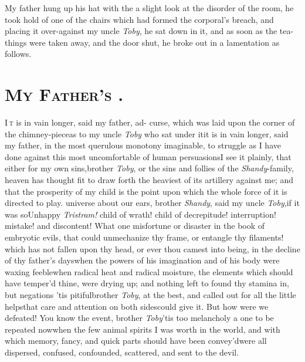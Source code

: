 \documentclass{article}
\begin{document}
My father hung up his hat with the  a slight look at the disorder of the room, he took
hold of one of the chairs which had formed the corporal’s
breach, and placing it over-against my uncle \textit{Toby}, he sat
down in it, and as soon as the tea-things were taken away, and the
door shut, he broke out in a lamentation as follows.

\section{\textsc{My Father's }.}

\lettrine{I}{\,t} is in vain longer, said my father,
ad-\break\hbox{}
curse, which was laid upon the corner of the chimney-piece\tsk as
to my uncle \textit{Toby} who sat under it\tsk it is in vain
longer,\pb
said my father, in the most querulous monotony imaginable,
to struggle as I have done against this most uncomfortable
of human persuasions\tsk I see it plainly, that either for
my own sins,\break brother \textit{Toby}, or the sins and follies
of the \textit{Shandy}-family, heaven has thought fit to
draw forth the heaviest of its artillery against me; and
that the prosperity of my child is the point upon which the
whole force of it is directed to play.\tsh\break
{} universe about our ears,
brother \textit{Shandy}, said my uncle \textit{Toby},\tsk if
it was so\tsk Unhappy \textit{Tristram!} child of wrath!
child of decrepitude!  interruption! mistake! and
discontent! What one misfortune or disaster in the book of
embryotic evils, that could unmechanize thy frame, or
entangle thy filaments!  which has not fallen upon thy head,
or ever thou camest\pb
{} 
into being, in the decline of thy father’s days\tsk when the
powers of his imagination and of his body were waxing
feeble\tsk when radical heat and radical moisture, the
elements which should have temper’d thine, were drying up;
and nothing left to found thy stamina in, but
negations\tsk\break
\tsk ’tis pitiful\tsk brother \textit{Toby}, at the best, and
called out for all the little helps\break that care and attention
on both sides\break could give it. But how were we defeated! You
know the event, brother \textit{Toby}\tsk ’tis too
melancholy a one to be repeated now\tsk when the few animal
spirits I was worth in the world, and with which memory,
fancy, and quick parts should have been convey’d\tsk were
all dispersed, confused, confounded, scattered, and sent to
the devil.\tsk
\end{document}
